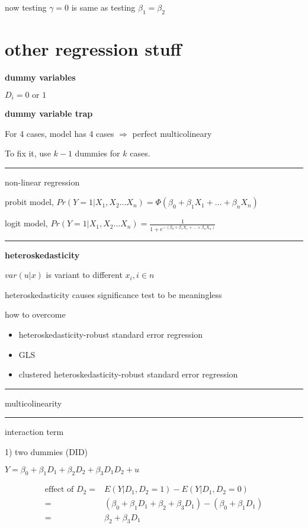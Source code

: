 \documentclass{article}
\providecommand{\tightlist}{
  \setlength{\itemsep}{0pt}
  \setlength{\parskip}{0pt}}
\newcommand*\sepline{%
  \begin{center}
    \rule[1ex]{.5\textwidth}{.5pt}
  \end{center}}
\begin{document}
now testing $\gamma=0$ is same as testing $\beta_{1}=\beta_{2}$




\section{other regression stuff}

\textbf{dummy variables}

$D_i=0 \text{ or } 1$

\textbf{dummy variable trap}

For 4 cases, model has 4 cases $\Rightarrow$ perfect multicolineary

To fix it, use $k-1$ dummies for $k$ cases.

\sepline

non-linear regression

probit model, $Pr(Y=1|X_1,X_2\dots X_n)=\Phi(\beta_0 +\beta_{1}X_1+\dots+\beta_{n} X_n)$

logit model, $Pr(Y=1|X_1,X_2\dots X_n)=\frac{1}{1+e^{-(\beta_0 +\beta_{1}X_1+\dots+\beta_{n} X_n)}}$


\sepline

\textbf{heteroskedasticity}

$var(u|x)$ is variant to different $x_i, i\in n$

heteroskedasticity causes significance test to be meaningless

how to overcome

\begin{itemize}
\tightlist
  \item heteroskedasticity-robust standard error regression
  \item GLS
  \item clustered heteroskedasticity-robust standard error regression
\end{itemize}

\sepline

multicolinearity

\sepline

interaction term

1) two dummies (DID)

$Y=\beta_0+\beta_{1}D_1+\beta_{2}D_2+\beta_{3}D_1 D_2+u$

\begin{equation}
  \begin{split}
  \text{effect of $D_2$}=&E(Y|D_1,D_2=1)-E(Y|D_1,D_2=0)\\
  =&(\beta_0+\beta_{1}D_1+\beta_{2}+\beta_{3}D_1)-(\beta_0+\beta_{1}D_1)
  \\=&\beta_2+\beta_3 D_1
  \end{split}
\end{equation}
\end{document}
